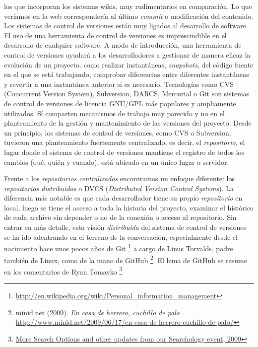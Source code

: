 \documentclass[12pt, a4paper,twoside]{book}
\begin{document}
los que incorporan los sistemas wikis, muy rudimentarios en
comparación. Lo que veríamos en la web correspondería al último
\emph{commit} o modificación del contenido. Los sistemas de control
de versiones están muy ligados al desarrollo de software. El uso de
una herramienta de control de versiones es imprescindible en el
desarrollo de cualquier software. A modo de introducción, una
herramienta de control de versiones ayudará a los desarrolladores a
gestionar de manera eficaz la evolución de un proyecto. como
realizar instantáneas, \emph{snapshots}, del código fuente en el
que se está trabajando, comprobar diferencias entre diferentes
instantáneas y revertir a una instantánea anterior si es necesario.
Tecnologías como CVS (Concurrent Version System), Subversion,
DARCS, Mercurial o Git son sistemas de control de versiones de
licencia GNU/GPL más populares y ampliamente utilizados. Sí
comparten mecanismos de trabajo muy parecido y no en el
planteamiento de la gestión y mantenimiento de las versiones del
proyecto. Desde un principio, los sistemas de control de versiones,
como CVS o Subversion, tuvieron una planteamiento fuertemente
centralizado, es decir, el \emph{repositorio}, el lugar donde el
sistema de control de versiones mantiene el registro de todos los
cambios (qué, quién y cuando), está ubicado en un único lugar o
servidor.

Frente a los \emph{repositorios centralizados} encontramos un
enfoque diferente: los \emph{repositorios distribuidos} o DVCS
(\emph{Distributed Version Control Systems}). La diferencia más
notable es que cada desarrollador tiene su propio
\emph{repositorio} en local, luego se tiene el acceso a toda la
historia del proyecto, examinar el histórico de cada archivo sin
depender o no de la conexión o acceso al repositorio. Sin entrar en
más detalle, esta visión \emph{distribuida} del sistema de control
de versiones se ha ido adentrando en el terreno de la conversación,
especialmente desde el nacimiento hace unos pocos años de Git%
\footnote{\href{http://en.wikipedia.org/wiki/Personal_information_management}{http://en.wikipedia.org/wiki/Personal\_information\_management}}
a cargo de Linus Torvalds, padre también de Linux, como de la mano
de GitHub%
\footnote{minid.net (2009). \emph{En casa de herrero, cuchillo de palo}
\href{http://www.minid.net/2009/06/17/en-casa-de-herrero-cuchillo-de-palo/}{http://www.minid.net/2009/06/17/en-casa-de-herrero-cuchillo-de-palo/}}.
El lema de GitHub se resume en los comentarios de Ryan Tomayko%
\footnote{\href{http://googleblog.blogspot.com/2009/05/more-search-options-and-other-updates.html}{More Search Options and other updates from our Searchology event, 2009}}
\end{document}
